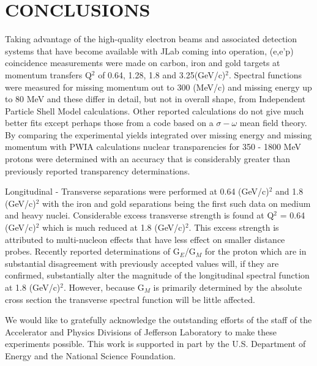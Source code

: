 \documentclass[aps,prl,twocolumn,showpacs,amsmath,amssymb,floats]{revtex4}
\begin{document}
 
\section*{CONCLUSIONS}

Taking advantage of the high-quality electron beams and associated detection 
systems that have become available with JLab coming into operation, (e,e'p) 
coincidence measurements were made
on carbon, iron and gold targets at momentum transfers Q$^2$ of 0.64, 1.28, 1.8 
and 3.25(GeV/c)$^2$.  Spectral functions were measured for missing momentum out 
to 300 (MeV/c) and missing energy up to 80 MeV and these differ in detail, but 
not in overall shape, from Independent Particle Shell Model 
calculations.  Other reported calculations do not give much better fits except 
perhaps those from a code based on a $\sigma - \omega$ mean field theory.  By 
comparing the experimental yields integrated over missing energy and missing 
momentum with PWIA calculations nuclear transparencies for 350 - 1800 MeV 
protons were determined with an accuracy that is considerably greater than 
previously reported transparency determinations.

Longitudinal - Transverse separations were performed at 0.64 (GeV/c)$^2$ and 
1.8 (GeV/c)$^2$ with
the iron and gold separations being the first such data on medium and heavy 
nuclei.  Considerable excess transverse strength is found at Q$^2$ = 0.64 
(GeV/c)$^2$ which is much reduced at 1.8 (GeV/c)$^2$.  This excess strength is 
attributed to multi-nucleon effects that have less effect on smaller distance 
probes.  Recently reported determinations of G$_E$/G$_M$ for the proton which 
are in substantial disagreement with previously accepted values will, if they 
are confirmed, substantially alter the magnitude of the longitudinal spectral 
function at 1.8 (GeV/c)$^2$.  However, because G$_M$ is primarily determined by 
the absolute cross section the transverse spectral function will be little 
affected. 

We would like to gratefully acknowledge the outstanding efforts of the
staff of the Accelerator and Physics Divisions of Jefferson Laboratory
to make these experiments possible. This work is supported in part by the U.S. 
Department of Energy and the 
National Science Foundation.  
\end{document}
